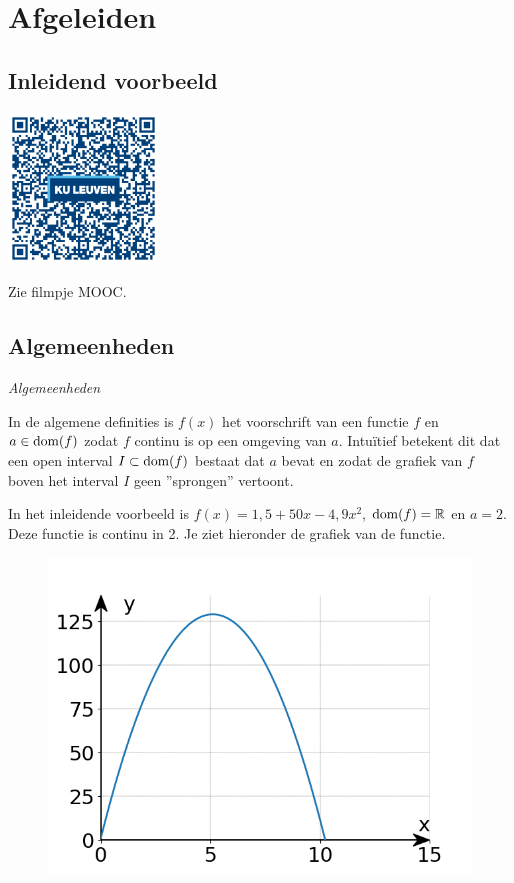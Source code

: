 \section{Afgeleiden}

\subsection{Inleidend voorbeeld}
\begin{minipage}{.25\linewidth}
	\raggedright
	\includegraphics[width=4cm]{6_afgeleiden_integralen/inputs/QR_Code_INLEIDENDVB_module6new}
\end{minipage}
\begin{minipage}{.7\linewidth}
	Zie filmpje MOOC.
\end{minipage}

\subsection{Algemeenheden}

\emph{Algemeenheden}

In de algemene definities is $f(x)$ het voorschrift van een functie $f$ en $a \in \operatorname{dom} (f)$ zodat $f$ continu is op een omgeving van $a$.
Intu\"itief betekent dit dat een open interval $I \subset \operatorname{dom} (f)$ bestaat dat $a$ bevat en zodat de grafiek van $f$ boven het interval $I$ geen ''sprongen'' vertoont.\vspace{5mm}

\begin{voorbeeld}
	In het inleidende voorbeeld is $f(x)=1,5+50 x -4,9 x^2$, $\operatorname{dom} (f)= \mathbb{R}$ en $a=2$.
	Deze functie is continu in 2. Je ziet hieronder de grafiek van de functie.
	\begin{figure}[h]
		\begin{center}
			\includegraphics[height=5 cm]{6_afgeleiden_integralen/inputs/1_2_vb1}
		\end{center}
	\end{figure}
\end{voorbeeld}

